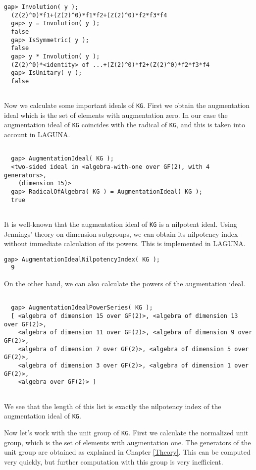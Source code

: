 \documentclass[a4paper,11pt]{report}
\begin{document}
{\begin{Verbatim}[fontsize=\small,frame=single,label=Example]
  gap> Involution( y );
  (Z(2)^0)*f1+(Z(2)^0)*f1*f2+(Z(2)^0)*f2*f3*f4
  gap> y = Involution( y );
  false
  gap> IsSymmetric( y );
  false
  gap> y * Involution( y );
  (Z(2)^0)*<identity> of ...+(Z(2)^0)*f2+(Z(2)^0)*f2*f3*f4  
  gap> IsUnitary( y );
  false
  
\end{Verbatim}
 Now we calculate some important ideals of \texttt{KG}. First we obtain the augmentation ideal which is the set of elements with
augmentation zero. In our case the augmentation ideal of \texttt{KG} coincides with the radical of \texttt{KG}, and this is taken into account in \textsf{LAGUNA}. 
\begin{Verbatim}[fontsize=\small,frame=single,label=Example]
  
  gap> AugmentationIdeal( KG );
  <two-sided ideal in <algebra-with-one over GF(2), with 4 generators>,
    (dimension 15)>
  gap> RadicalOfAlgebra( KG ) = AugmentationIdeal( KG );
  true
  
\end{Verbatim}
 It is well-known that the augmentation ideal of \texttt{KG} is a nilpotent ideal. Using Jennings' theory on dimension subgroups, we can
obtain its nilpotency index without immediate calculation of its powers. This
is implemented in \textsf{LAGUNA}. 
\begin{Verbatim}[fontsize=\small,frame=single,label=Example]
  gap> AugmentationIdealNilpotencyIndex( KG );
  9
\end{Verbatim}
 \newpage On the other hand, we can also calculate the powers of the augmentation ideal. 
\begin{Verbatim}[fontsize=\small,frame=single,label=Example]
  
  gap> AugmentationIdealPowerSeries( KG );
  [ <algebra of dimension 15 over GF(2)>, <algebra of dimension 13 over GF(2)>, 
    <algebra of dimension 11 over GF(2)>, <algebra of dimension 9 over GF(2)>, 
    <algebra of dimension 7 over GF(2)>, <algebra of dimension 5 over GF(2)>, 
    <algebra of dimension 3 over GF(2)>, <algebra of dimension 1 over GF(2)>, 
    <algebra over GF(2)> ]
  
\end{Verbatim}
 We see that the length of this list is exactly the nilpotency index of the
augmentation ideal of \texttt{KG}. 

 Now let's work with the unit group of \texttt{KG}. First we calculate the normalized unit group, which is the set of elements
with augmentation one. The generators of the unit group are obtained as
explained in Chapter \ref{Theory}. This can be computed very quickly, but further computation with this group
is very inefficient. 
\begin{Verbatim}[fontsize=\small,frame=single,label=Example]
  

\end{Verbatim}}
\end{document}
